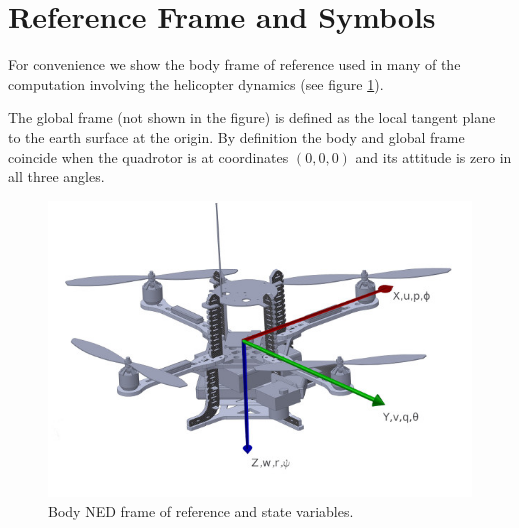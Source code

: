 \documentclass[a4paper,11pt]{report}
\begin{document}
\section{Reference Frame and Symbols}

For convenience we show the body frame of reference used in many of the computation involving the helicopter dynamics (see figure \ref{fig:axes}).
 
The global frame (not shown in the figure) is defined as the local tangent plane to the earth surface at the origin. 
By definition the body and global frame coincide when the quadrotor is at coordinates $(0,0,0)$ and its attitude is zero in all three angles.
\begin{figure}[htbp]
 \begin{center}
 \includegraphics[width=13cm]{fig/axes.jpg}
\caption{Body NED frame of reference and state variables.\label{fig:axes}}
\end{center}
\end{figure} 
\end{document}
